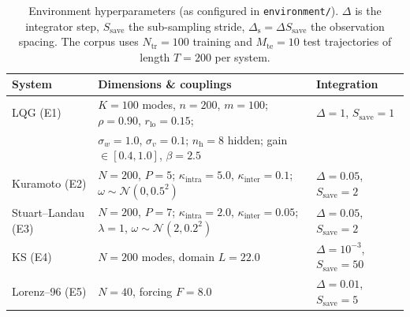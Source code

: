 \documentclass[10pt]{article}
\theoremstyle{plain}
\theoremstyle{definition}
\theoremstyle{remark}
\begin{document}
\begin{table}[t]
\centering\small
\setlength{\tabcolsep}{4.5pt}\renewcommand{\arraystretch}{1.18}
\caption{Environment hyperparameters (as configured in \texttt{environment/}).
$\Delta$ is the integrator step, $S_{\mathrm{save}}$ the sub-sampling stride,
$\Delta_{\mathrm s}=\Delta S_{\mathrm{save}}$ the observation spacing. The corpus
uses $N_{\mathrm{tr}}=100$ training and $M_{\mathrm{te}}=10$ test trajectories of
length $T=200$ per system.}
\label{tab:hyper}
\begin{tabular}{@{}lll@{}}
\toprule
System & Dimensions \& couplings & Integration\\
\midrule
LQG (E1) & $K{=}100$ modes, $n{=}200$, $m{=}100$; $\rho{=}0.90$, $r_{\mathrm{lo}}{=}0.15$; & $\Delta{=}1$, $S_{\mathrm{save}}{=}1$\\
 & $\sigma_w{=}1.0$, $\sigma_v{=}0.1$; $n_{\mathrm h}{=}8$ hidden; gain $\in[0.4,1.0]$, $\beta{=}2.5$ & \\
Kuramoto (E2) & $N{=}200$, $P{=}5$; $\kappa_{\mathrm{intra}}{=}5.0$, $\kappa_{\mathrm{inter}}{=}0.1$; $\omega\!\sim\!\mathcal N(0,0.5^2)$ & $\Delta{=}0.05$, $S_{\mathrm{save}}{=}2$\\
Stuart--Landau (E3) & $N{=}200$, $P{=}7$; $\kappa_{\mathrm{intra}}{=}2.0$, $\kappa_{\mathrm{inter}}{=}0.05$; $\lambda{=}1$, $\omega\!\sim\!\mathcal N(2,0.2^2)$ & $\Delta{=}0.05$, $S_{\mathrm{save}}{=}2$\\
KS (E4) & $N{=}200$ modes, domain $L{=}22.0$ & $\Delta{=}10^{-3}$, $S_{\mathrm{save}}{=}50$\\
Lorenz--96 (E5) & $N{=}40$, forcing $F{=}8.0$ & $\Delta{=}0.01$, $S_{\mathrm{save}}{=}5$\\
\bottomrule
\end{tabular}
\end{table}
\end{document}

